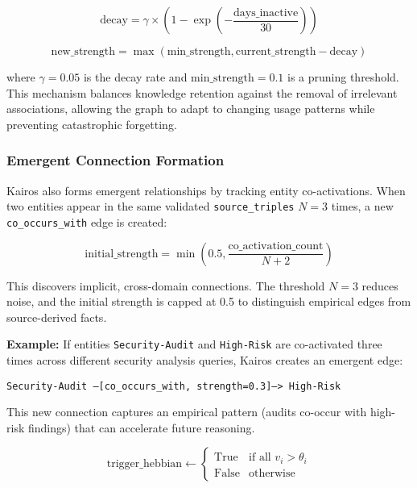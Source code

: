 \documentclass{article}
\begin{document}
\begin{equation}
\text{decay} = \gamma \times \left(1 - \exp\left(-\frac{\text{days\_inactive}}{30}\right)\right)
\label{eq:ltd}
\end{equation}

\begin{equation}
\text{new\_strength} = \max(\text{min\_strength}, \text{current\_strength} - \text{decay})
\end{equation}

where $\gamma = 0.05$ is the decay rate and $\text{min\_strength} = 0.1$ is a pruning threshold. This mechanism balances knowledge retention against the removal of irrelevant associations, allowing the graph to adapt to changing usage patterns while preventing catastrophic forgetting.

\subsubsection{Emergent Connection Formation}

Kairos also forms emergent relationships by tracking entity co-activations. When two entities appear in the same validated \texttt{source\_triples} $N=3$ times, a new \texttt{co\_occurs\_with} edge is created:

\begin{equation}
\text{initial\_strength} = \min\left(0.5, \frac{\text{co\_activation\_count}}{N + 2}\right)
\end{equation}

This discovers implicit, cross-domain connections. The threshold $N=3$ reduces noise, and the initial strength is capped at 0.5 to distinguish empirical edges from source-derived facts.

\textbf{Example:} If entities \texttt{Security-Audit} and \texttt{High-Risk} are co-activated three times across different security analysis queries, Kairos creates an emergent edge:

\begin{center}
\texttt{Security-Audit --[co\_occurs\_with, strength=0.3]--> High-Risk}
\end{center}

This new connection captures an empirical pattern (audits co-occur with high-risk findings) that can accelerate future reasoning.

\begin{equation}
\text{trigger\_hebbian} \leftarrow \begin{cases}
\text{True} & \text{if all } v_i > \theta_i \\
\text{False} & \text{otherwise}
\end{cases}
\end{equation}
\end{document}
